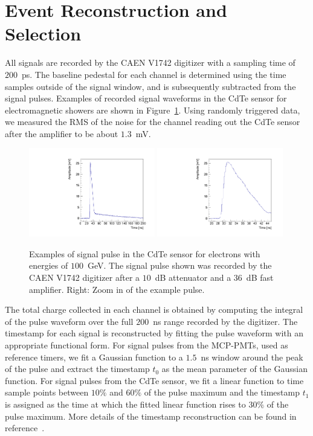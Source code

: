 
\section{Event Reconstruction and Selection }
\label{sec:reco}

All signals are recorded by the CAEN V1742 digitizer with a sampling time of $200$~ps.
The baseline pedestal for each channel is determined using the time samples outside of
the signal window, and is subsequently subtracted from the signal pulses. Examples of recorded
signal waveforms in the CdTe sensor for electromagnetic showers are shown in Figure~\ref{fig:Pulses}.
Using randomly triggered data, we measured the RMS of the noise for the channel reading out 
the CdTe sensor after the amplifier to be about $1.3$~mV. 

\begin{figure}[htbp] 
\centering
\includegraphics[width=0.49\textwidth]{figures/CdTe_pulse.pdf}
\includegraphics[width=0.49\textwidth]{figures/CdTe_pulseZ.pdf} 
\caption{Examples of signal pulse in the CdTe sensor for electrons with energies of $100$~GeV. 
The signal pulse shown was recorded by the CAEN V1742 digitizer after a $10$~dB 
attenuator and a $36$~dB fast amplifier. Right: Zoom in of the example pulse. } 
\label{fig:Pulses} 
\end{figure} 

The total charge collected in each channel is obtained by computing the integral of the pulse
waveform over the full $200$~ns range recorded by the digitizer. 
The timestamp for each signal is reconstructed by fitting the pulse waveform with
an appropriate functional form. For signal pulses from the MCP-PMTs, used as reference timers, 
we fit a Gaussian function to a $1.5$~ns window around the peak of the pulse and extract the 
timestamp $t_{0}$ as the mean parameter of the Gaussian function. For signal pulses from the
CdTe sensor, we fit a linear function to time sample points between $10\%$ and $60\%$ of the pulse
maximum and the timestamp $t_{1}$ is assigned as the time at which the fitted linear function
rises to $30\%$ of the pulse maximum. More details of the timestamp reconstruction can be
found in reference~\cite{Anderson:2015gha}.


